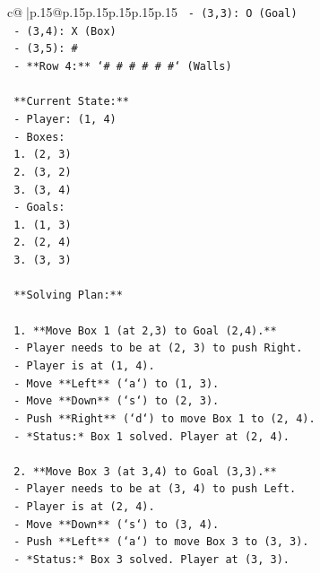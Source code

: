 \documentclass{article}
\begin{document}
{\begin{supertabular}{c@{$\;$}|p{.15\linewidth}@{}p{.15\linewidth}p{.15\linewidth}p{.15\linewidth}p{.15\linewidth}p{.15\linewidth}}
{{{\texttt{      {-} (3,3): O (Goal)} \\
\texttt{      {-} (3,4): X (Box)} \\
\texttt{      {-} (3,5): \#} \\
\texttt{    {-} **Row 4:** `\# \# \# \# \# \#` (Walls)} \\
\\ 
\texttt{    **Current State:**} \\
\texttt{    {-} Player: (1, 4)} \\
\texttt{    {-} Boxes:} \\
\texttt{      1. (2, 3)} \\
\texttt{      2. (3, 2)} \\
\texttt{      3. (3, 4)} \\
\texttt{    {-} Goals:} \\
\texttt{      1. (1, 3)} \\
\texttt{      2. (2, 4)} \\
\texttt{      3. (3, 3)} \\
\\ 
\texttt{    **Solving Plan:**} \\
\\ 
\texttt{    1.  **Move Box 1 (at 2,3) to Goal (2,4).**} \\
\texttt{        {-} Player needs to be at (2, 3) to push Right.} \\
\texttt{        {-} Player is at (1, 4).} \\
\texttt{        {-} Move **Left** (`a`) to (1, 3).} \\
\texttt{        {-} Move **Down** (`s`) to (2, 3).} \\
\texttt{        {-} Push **Right** (`d`) to move Box 1 to (2, 4).} \\
\texttt{        {-} *Status:* Box 1 solved. Player at (2, 4).} \\
\\ 
\texttt{    2.  **Move Box 3 (at 3,4) to Goal (3,3).**} \\
\texttt{        {-} Player needs to be at (3, 4) to push Left.} \\
\texttt{        {-} Player is at (2, 4).} \\
\texttt{        {-} Move **Down** (`s`) to (3, 4).} \\
\texttt{        {-} Push **Left** (`a`) to move Box 3 to (3, 3).} \\
\texttt{        {-} *Status:* Box 3 solved. Player at (3, 3).} \\
\\ 
}}}
\end{supertabular}}
\end{document}
